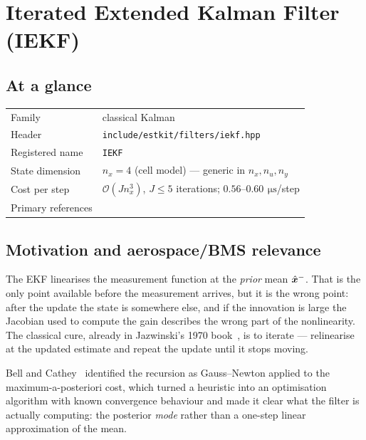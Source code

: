 \chapter{Iterated Extended Kalman Filter (IEKF)}
\label{ch:iekf}

\section*{At a glance}
\begin{tabular}{@{}l>{\raggedright\arraybackslash}p{}@{}}
Family & classical Kalman \\
Header & \texttt{include/estkit/filters/iekf.hpp} \\
Registered name & \texttt{IEKF} \\
State dimension & $n_x = 4$ (cell model) --- generic in $n_x, n_u, n_y$ \\
Cost per step & $\mathcal{O}(J n_x^3)$, $J\le5$ iterations; $0.56$--$0.60\,\SI{}{\micro\second}$/step \\
Primary references & \cite{jazwinski1970,bellcathey1993,gelb1974} \\
\end{tabular}

\section{Motivation and aerospace/BMS relevance}
The EKF linearises the measurement function at the \emph{prior} mean $\hat{\bm{x}}^{-}$. That is the
only point available before the measurement arrives, but it is the wrong point: after the
update the state is somewhere else, and if the innovation is large the Jacobian used to
compute the gain describes the wrong part of the nonlinearity. The classical cure, already in
Jazwinski's 1970 book~\cite[\S8.3]{jazwinski1970}, is to iterate --- relinearise at the
updated estimate and repeat the update until it stops moving.

Bell and Cathey~\cite{bellcathey1993} identified the recursion as Gauss--Newton applied to
the maximum-a-posteriori cost, which turned a heuristic into an optimisation algorithm with
known convergence behaviour and made it clear what the filter is actually computing: the
posterior \emph{mode} rather than a one-step linear approximation of the mean.

